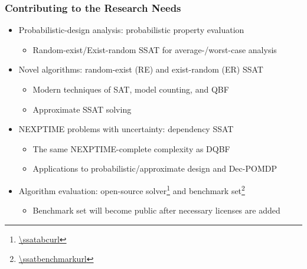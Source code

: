 \begin{frame}
      \frametitle{Contributing to the Research Needs}
      \begin{itemize}
            \item Probabilistic-design analysis: \alert{probabilistic property evaluation}
                  \begin{itemize}
                        \item Random-exist/Exist-random SSAT for average-/worst-case analysis
                  \end{itemize}
                  \pause
            \item Novel algorithms: \alert{random-exist (RE) and exist-random (ER) SSAT}
                  \begin{itemize}
                        \item Modern techniques of SAT, model counting, and QBF
                        \item Approximate SSAT solving
                  \end{itemize}
                  \pause
            \item NEXPTIME problems with uncertainty: \alert{dependency SSAT}
                  \begin{itemize}
                        \item The same NEXPTIME-complete complexity as DQBF
                        \item Applications to probabilistic/approximate design and Dec-POMDP
                  \end{itemize}
                  \pause
            \item Algorithm evaluation: \alert{open-source solver\footnote{\url{\ssatabcurl}} and benchmark set\footnote{\url{\ssatbenchmarkurl}}}
                  \begin{itemize}
                        \item Benchmark set will become public after necessary licenses are added
                  \end{itemize}
      \end{itemize}
\end{frame}